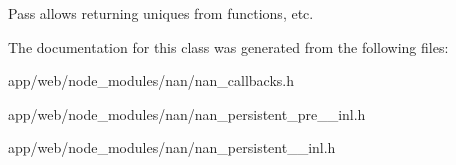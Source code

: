 Pass allows returning uniques from functions, etc. 

The documentation for this class was generated from the following files\+:\begin{DoxyCompactItemize}
\item 
app/web/node\+\_\+modules/nan/nan\+\_\+callbacks.\+h\item 
app/web/node\+\_\+modules/nan/nan\+\_\+persistent\+\_\+pre\+\_\+\_\+inl.\+h\item 
app/web/node\+\_\+modules/nan/nan\+\_\+persistent\+\_\+\_\+inl.\+h\end{DoxyCompactItemize}
